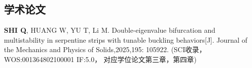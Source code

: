 \begin{resume}
  \subsection*{学术论文}

  \begin{achievements}
    \item \textbf{SHI Q}, HUANG W, YU T, Li M. Double-eigenvalue bifurcation and multistability in serpentine strips with tunable buckling behaviors[J]. Journal of the Mechanics and Physics of Solids,2025,195: 105922. (SCI收录，WOS:001364802100001 IF:5.0， 对应学位论文第三章，第四章)

  \end{achievements}


\end{resume}
